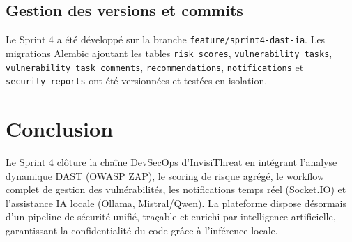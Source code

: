 \subsection{Gestion des versions et commits}
Le Sprint 4 a été développé sur la branche \texttt{feature/sprint4-dast-ia}. Les migrations Alembic ajoutant les tables \texttt{risk\_scores}, \texttt{vulnerability\_tasks}, \texttt{vulnerability\_task\_comments}, \texttt{recommendations}, \texttt{notifications} et \texttt{security\_reports} ont été versionnées et testées en isolation.

\section{Conclusion}
Le Sprint 4 clôture la chaîne DevSecOps d'InvisiThreat en intégrant l'analyse dynamique DAST (OWASP ZAP), le scoring de risque agrégé, le workflow complet de gestion des vulnérabilités, les notifications temps réel (Socket.IO) et l'assistance IA locale (Ollama, Mistral/Qwen). La plateforme dispose désormais d'un pipeline de sécurité unifié, traçable et enrichi par intelligence artificielle, garantissant la confidentialité du code grâce à l'inférence locale.
